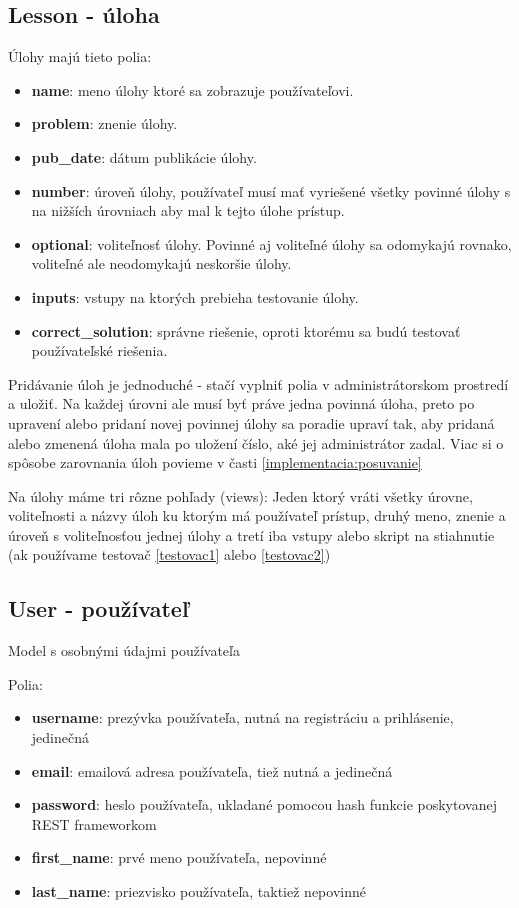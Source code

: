 \subsection{Lesson - úloha}
\label{doc:lesson}
Úlohy majú tieto polia:
\begin{itemize}
\itemsep0em
\item \textbf{name}: meno úlohy ktoré sa zobrazuje používateľovi.
\item \textbf{problem}: znenie úlohy.
\item \textbf{pub\_date}: dátum publikácie úlohy.
\item \textbf{number}: úroveň úlohy, používateľ musí mať vyriešené všetky povinné úlohy s
  na nižších úrovniach aby mal k tejto úlohe prístup.
\item \textbf{optional}: voliteľnosť úlohy. Povinné aj voliteľné úlohy sa odomykajú rovnako, voliteľné
   ale neodomykajú neskoršie úlohy.
\item \textbf{inputs}: vstupy na ktorých prebieha testovanie úlohy.
\item \textbf{correct\_solution}: správne riešenie, oproti ktorému sa budú testovať používateľské
   riešenia.
\end{itemize}

Pridávanie úloh je jednoduché - stačí vyplniť polia v administrátorskom prostredí
a uložiť. Na každej úrovni ale musí byť práve jedna povinná úloha, preto po upravení
alebo pridaní novej povinnej úlohy sa poradie upraví tak, aby pridaná alebo zmenená úloha mala
po uložení číslo, aké jej administrátor zadal. Viac si o spôsobe zarovnania úloh povieme v časti
\ref{implementacia:posuvanie}

Na úlohy máme tri rôzne pohľady (views): Jeden ktorý vráti všetky úrovne, voliteľnosti a názvy úloh ku ktorým má
používateľ prístup, druhý meno, znenie a úroveň s voliteľnosťou jednej úlohy a tretí
iba vstupy alebo skript na stiahnutie (ak používame testovač \ref{testovac1} alebo \ref{testovac2})

\subsection{User - používateľ}
Model s osobnými údajmi používateľa

Polia:
\begin{itemize}
\item \textbf{username}: prezývka používateľa, nutná na registráciu a prihlásenie, jedinečná
\item \textbf{email}: emailová adresa používateľa, tiež nutná a jedinečná
\item \textbf{password}: heslo používateľa, ukladané pomocou hash funkcie poskytovanej
                        REST frameworkom
\item \textbf{first\_name}: prvé meno používateľa, nepovinné
\item \textbf{last\_name}: priezvisko používateľa, taktiež nepovinné
\end{itemize}


